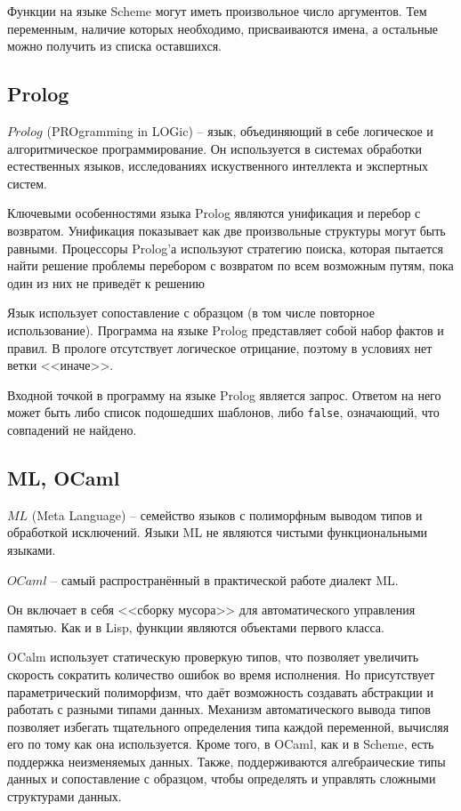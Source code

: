         Функции на языке Scheme могут иметь произвольное число аргументов.
        Тем переменным, наличие которых необходимо, присваиваются имена, а остальные можно получить из списка оставшихся.

    \subsection{Prolog}
        $Prolog$ (PROgramming in LOGic) -- язык, объединяющий в себе логическое и алгоритмическое программирование.
        Он используется в системах обработки естественных языков, исследованиях искуственного интеллекта и экспертных систем.

        Ключевыми особенностями языка Prolog являются унификация и перебор с возвратом.
        Унификация показывает как две произвольные структуры могут быть равными.
        Процессоры Prolog'а используют стратегию поиска, которая пытается найти решение проблемы перебором с возвратом по всем возможным путям, пока один из них не приведёт к решению\cite{prolog}

        Язык использует сопоставление с образцом (в том числе повторное использование).
        Программа на языке Prolog представляет собой набор фактов и правил.
        В прологе отсутствует логическое отрицание, поэтому в условиях нет ветки <<иначе>>.

        Входной точкой в программу на языке Prolog является запрос.
        Ответом на него может быть либо список подошедших шаблонов, либо \verb!false!, означающий, что совпадений не найдено.

    \subsection{ML, OCaml}
        $ML$ (Meta Language) -- семейство языков с полиморфным выводом типов и обработкой исключений.
        Языки ML не являются чистыми функциональными языками.
        
        $OCaml$ -- самый распространённый в практической работе диалект ML.

        Он включает в себя <<сборку мусора>> для автоматического управления памятью.
        Как и в Lisp, функции являются объектами первого класса.

        OCalm использует статическую проверкую типов, что позволяет увеличить скорость сократить количество ошибок во время исполнения.
        Но присутствует параметрический полиморфизм, что даёт возможность создавать абстракции и работать с разными типами данных.
        Механизм автоматического вывода типов позволяет избегать тщательного определения типа каждой переменной, вычисляя его по тому как она используется.
        Кроме того, в OCaml, как и в Scheme, есть поддержка неизменяемых данных.
        Также, поддерживаются алгебраические типы данных и сопоставление с образцом, чтобы определять и управлять сложными структурами данных.\cite{ocaml}

